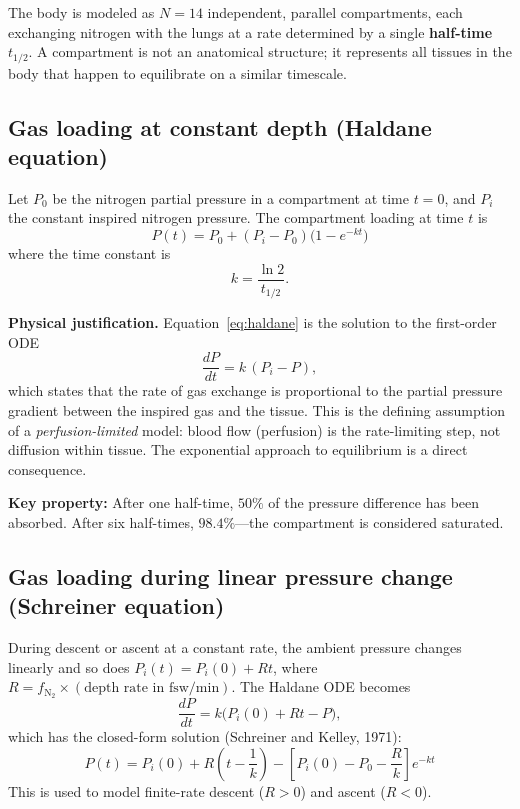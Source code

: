 \documentclass[11pt,letterpaper]{article}
\begin{document}
The body is modeled as $N=14$ independent, parallel compartments, each
exchanging nitrogen with the lungs at a rate determined by a single
\textbf{half-time} $t_{1/2}$.  A compartment is not an anatomical structure;
it represents all tissues in the body that happen to equilibrate on a
similar timescale.

\subsection{Gas loading at constant depth (Haldane equation)}

Let $P_0$ be the nitrogen partial pressure in a compartment at time $t=0$,
and $P_i$ the constant inspired nitrogen pressure.  The compartment
loading at time $t$ is
\begin{equation}
  \boxed{
  P(t) = P_0 + (P_i - P_0)\bigl(1 - e^{-kt}\bigr)
  }
  \label{eq:haldane}
\end{equation}
where the time constant is
\begin{equation}
  k = \frac{\ln 2}{t_{1/2}}.
  \label{eq:k}
\end{equation}

\textbf{Physical justification.}  Equation~\eqref{eq:haldane} is the
solution to the first-order ODE
\[
  \frac{dP}{dt} = k\,(P_i - P),
\]
which states that the rate of gas exchange is proportional to the partial
pressure gradient between the inspired gas and the tissue.  This is the
defining assumption of a \emph{perfusion-limited} model: blood flow
(perfusion) is the rate-limiting step, not diffusion within tissue.  The
exponential approach to equilibrium is a direct consequence.

\textbf{Key property:} After one half-time, $50\%$ of the pressure difference
has been absorbed.  After six half-times, $98.4\%$---the compartment is
considered saturated.

\subsection{Gas loading during linear pressure change (Schreiner equation)}

During descent or ascent at a constant rate, the ambient pressure changes
linearly and so does $P_i(t) = P_i(0) + Rt$, where $R = f_{\mathrm{N}_2}
\times (\text{depth rate in fsw/min})$.  The Haldane ODE becomes
\[
  \frac{dP}{dt} = k\bigl(P_i(0) + Rt - P\bigr),
\]
which has the closed-form solution (Schreiner and Kelley, 1971):
\begin{equation}
  \boxed{
  P(t) = P_i(0) + R\!\left(t - \frac{1}{k}\right)
       - \left[P_i(0) - P_0 - \frac{R}{k}\right] e^{-kt}
  }
  \label{eq:schreiner}
\end{equation}
This is used to model finite-rate descent ($R > 0$) and ascent ($R < 0$).
\end{document}
